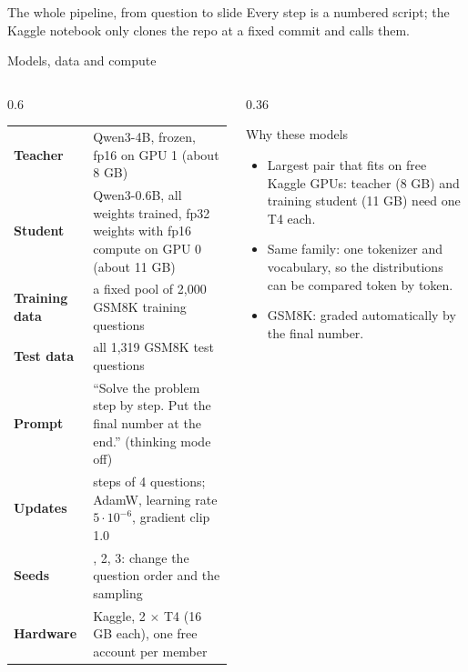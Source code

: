 \begin{frame}{The whole pipeline, from question to slide\hfill{}}
  {\scriptsize Every step is a numbered script; the Kaggle notebook only clones the repo at a fixed commit and calls them.}
\end{frame}

\begin{frame}{Models, data and compute\hfill{}}
  \begin{columns}[T]
    \begin{column}{0.6\textwidth}
      \footnotesize
      \renewcommand{\arraystretch}{1.2}
      \begin{tabular}{@{}>{\bfseries}l>{\raggedright\arraybackslash}p{5.6cm}@{}}
        \toprule
        Teacher & Qwen3-4B, frozen, fp16 on GPU 1 (about 8 GB) \\
        Student & Qwen3-0.6B, all weights trained, fp32 weights with fp16
                  compute on GPU 0 (about 11 GB) \\
        Training data & a fixed pool of 2,000 GSM8K training questions \\
        Test data & all 1,319 GSM8K test questions \\
        Prompt & ``Solve the problem step by step. Put the final number
                 at the end.'' (thinking mode off) \\
        Updates & 500 steps of 4 questions; AdamW, learning rate
                  $5\cdot10^{-6}$, gradient clip 1.0 \\
        Seeds & 1, 2, 3: change the question order and the sampling \\
        Hardware & Kaggle, 2 $\times$ T4 (16 GB each), one free account per member \\
        \bottomrule
      \end{tabular}
    \end{column}
    \begin{column}{0.36\textwidth}
      \begin{block}{Why these models}
        \footnotesize
        \begin{itemize}
          \item Largest pair that fits on free Kaggle GPUs: teacher
                (8 GB) and training student (11 GB) need one T4 each.
          \item Same family: one tokenizer and vocabulary, so the
                distributions can be compared token by token.
          \item GSM8K: graded automatically by the final number.
        \end{itemize}
      \end{block}
    \end{column}
  \end{columns}
\end{frame}

